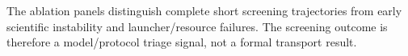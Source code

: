 The ablation panels distinguish complete short screening trajectories from early scientific instability and launcher/resource failures. The screening outcome is therefore a model/protocol triage signal, not a formal transport result.
